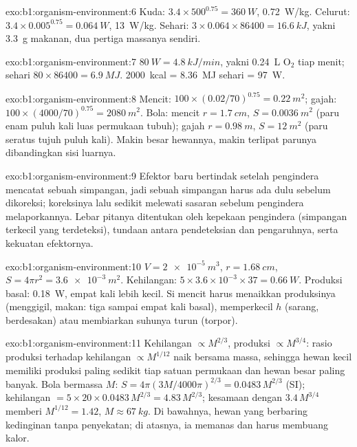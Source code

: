 \begin{solution}{exo:b1:organism-environment:6}
Kuda: $3.4\times 500^{0.75} = \qty{360}{W}$, \qty{0.72}{W/kg}. Celurut:
$3.4\times 0.005^{0.75} = \qty{0.064}{W}$, \qty{13}{W/kg}. Sehari:
$3\times 0.064\times 86400 = \qty{16.6}{kJ}$, yakni \qty{3.3}{g} makanan,
dua pertiga massanya sendiri.
\end{solution}

\begin{solution}{exo:b1:organism-environment:7}
$\qty{80}{W} = \qty{4.8}{kJ/min}$, yakni \qty{0.24}{L} $\mathrm{O_2}$
tiap menit; sehari $80\times 86400 = \qty{6.9}{MJ}$. \qty{2000}{kcal}
= \qty{8.36}{MJ} sehari = \qty{97}{W}.
\end{solution}

\begin{solution}{exo:b1:organism-environment:8}
Mencit: $100\times(0.02/70)^{0.75} = \qty{0.22}{m^2}$; gajah:
$100\times(4000/70)^{0.75} = \qty{2080}{m^2}$. Bola: mencit
$r = \qty{1.7}{cm}$, $S = \qty{0.0036}{m^2}$ (paru enam puluh kali luas
permukaan tubuh); gajah $r = \qty{0.98}{m}$, $S = \qty{12}{m^2}$ (paru
seratus tujuh puluh kali). Makin besar hewannya, makin terlipat parunya
dibandingkan sisi luarnya.
\end{solution}

\begin{solution}{exo:b1:organism-environment:9}
Efektor baru bertindak setelah pengindera mencatat sebuah simpangan,
jadi sebuah simpangan harus ada dulu sebelum dikoreksi; koreksinya lalu
sedikit melewati sasaran sebelum pengindera melaporkannya. Lebar pitanya
ditentukan oleh kepekaan pengindera (simpangan terkecil yang terdeteksi),
tundaan antara pendeteksian dan pengaruhnya, serta kekuatan efektornya.
\end{solution}

\begin{solution}{exo:b1:organism-environment:10}
$V = \qty{2e-5}{m^3}$, $r = \qty{1.68}{cm}$, $S = 4\pi r^2 =
\qty{3.6e-3}{m^2}$. Kehilangan: $5\times 3.6\times 10^{-3}\times 37 =
\qty{0.66}{W}$. Produksi basal: \qty{0.18}{W}, empat kali lebih kecil.
Si mencit harus menaikkan produksinya (menggigil, makan: tiga sampai
empat kali basal), memperkecil $h$ (sarang, berdesakan) atau membiarkan
suhunya turun (torpor).
\end{solution}

\begin{solution}{exo:b1:organism-environment:11}
Kehilangan $\propto M^{2/3}$, produksi $\propto M^{3/4}$: rasio
produksi terhadap kehilangan $\propto M^{1/12}$ naik bersama massa,
sehingga hewan kecil memiliki produksi paling sedikit tiap satuan
permukaan dan hewan besar paling banyak. Bola bermassa $M$:
$S = 4\pi(3M/4000\pi)^{2/3} = \num{0.0483}\,M^{2/3}$ (SI); kehilangan
$= 5\times 20\times 0.0483\,M^{2/3} = 4.83\,M^{2/3}$; kesamaan dengan
$3.4\,M^{3/4}$ memberi $M^{1/12} = 1.42$, $M \approx \qty{67}{kg}$. Di
bawahnya, hewan yang berbaring kedinginan tanpa penyekatan; di atasnya,
ia memanas dan harus membuang kalor.
\end{solution}

